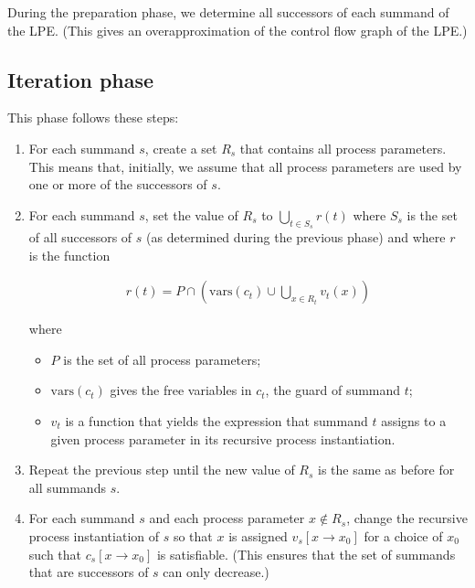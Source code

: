 During the preparation phase, we determine all successors of each summand of the LPE.
(This gives an overapproximation of the control flow graph of the LPE.)

\subsection{Iteration phase}

This phase follows these steps:

\begin{enumerate}

\item For each summand $s$, create a set $R_s$ that contains all process parameters.
This means that, initially, we assume that all process parameters are used by one or more of the successors of $s$.

\item For each summand $s$, set the value of $R_s$ to $\bigcup\limits_{t \in S_s}^{} r(t)$ where $S_s$ is the set of all successors of $s$ (as determined during the previous phase) and where $r$ is the function

\begin{align*}
r(t) = P \cap \left( \text{vars}(c_t) \cup \bigcup\limits_{x \in R_t}^{} v_t(x) \right)
\end{align*}

where

\begin{itemize}
\item $P$ is the set of all process parameters;
\item $\text{vars}(c_t)$ gives the free variables in $c_t$, the guard of summand $t$;
\item $v_t$ is a function that yields the expression that summand $t$ assigns to a given process parameter in its recursive process instantiation.
\end{itemize}

\item Repeat the previous step until the new value of $R_s$ is the same as before for all summands $s$.

\item For each summand $s$ and each process parameter $x \notin R_s$, change the recursive process instantiation of $s$ so that $x$ is assigned ${v_s}[x \rightarrow x_0]$ for a choice of $x_0$ such that ${c_s}[x \rightarrow x_0]$ is satisfiable.
(This ensures that the set of summands that are successors of $s$ can only decrease.)

\end{enumerate}

